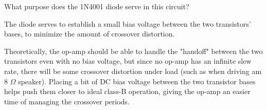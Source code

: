 

What purpose does the 1N4001 diode serve in this circuit?







The diode serves to establish a small bias voltage between the two transistors' bases, to minimize the amount of crossover distortion.







Theoretically, the op-amp should be able to handle the "handoff" between the two transistors even with no bias voltage, but since no op-amp has an infinite slew rate, there will be some crossover distortion under load (such as when driving am 8 $\Omega$ speaker).  Placing a bit of DC bias voltage between the two transistor bases helps push them closer to ideal class-B operation, giving the op-amp an easier time of managing the crossover periods.




